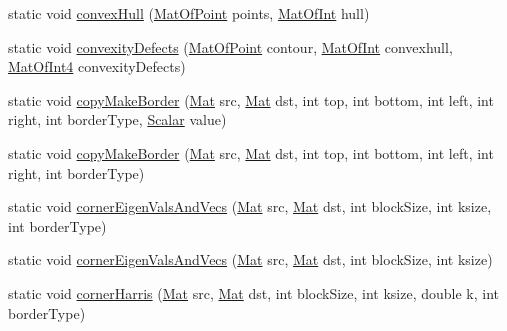 \begin{DoxyCompactItemize}
\item 
static void \mbox{\hyperlink{classorg_1_1opencv_1_1imgproc_1_1_imgproc_aea7e7b3c039ba7d3c04629b3a9cd399d}{convex\+Hull}} (\mbox{\hyperlink{classorg_1_1opencv_1_1core_1_1_mat_of_point}{Mat\+Of\+Point}} points, \mbox{\hyperlink{classorg_1_1opencv_1_1core_1_1_mat_of_int}{Mat\+Of\+Int}} hull)
\item 
static void \mbox{\hyperlink{classorg_1_1opencv_1_1imgproc_1_1_imgproc_a209ed56855c2b90701908839e25f773a}{convexity\+Defects}} (\mbox{\hyperlink{classorg_1_1opencv_1_1core_1_1_mat_of_point}{Mat\+Of\+Point}} contour, \mbox{\hyperlink{classorg_1_1opencv_1_1core_1_1_mat_of_int}{Mat\+Of\+Int}} convexhull, \mbox{\hyperlink{classorg_1_1opencv_1_1core_1_1_mat_of_int4}{Mat\+Of\+Int4}} convexity\+Defects)
\item 
static void \mbox{\hyperlink{classorg_1_1opencv_1_1imgproc_1_1_imgproc_aeeb280b7ea42158d887ce0d82e6ea0e4}{copy\+Make\+Border}} (\mbox{\hyperlink{classorg_1_1opencv_1_1core_1_1_mat}{Mat}} src, \mbox{\hyperlink{classorg_1_1opencv_1_1core_1_1_mat}{Mat}} dst, int top, int bottom, int left, int right, int border\+Type, \mbox{\hyperlink{classorg_1_1opencv_1_1core_1_1_scalar}{Scalar}} value)
\item 
static void \mbox{\hyperlink{classorg_1_1opencv_1_1imgproc_1_1_imgproc_a9a788b12632bb2021d6fc4194c524364}{copy\+Make\+Border}} (\mbox{\hyperlink{classorg_1_1opencv_1_1core_1_1_mat}{Mat}} src, \mbox{\hyperlink{classorg_1_1opencv_1_1core_1_1_mat}{Mat}} dst, int top, int bottom, int left, int right, int border\+Type)
\item 
static void \mbox{\hyperlink{classorg_1_1opencv_1_1imgproc_1_1_imgproc_aa13f522ce6ccde35a54983d35640c3e1}{corner\+Eigen\+Vals\+And\+Vecs}} (\mbox{\hyperlink{classorg_1_1opencv_1_1core_1_1_mat}{Mat}} src, \mbox{\hyperlink{classorg_1_1opencv_1_1core_1_1_mat}{Mat}} dst, int block\+Size, int ksize, int border\+Type)
\item 
static void \mbox{\hyperlink{classorg_1_1opencv_1_1imgproc_1_1_imgproc_a2d6d62e47c79f1dea4f66b9bebbe7b35}{corner\+Eigen\+Vals\+And\+Vecs}} (\mbox{\hyperlink{classorg_1_1opencv_1_1core_1_1_mat}{Mat}} src, \mbox{\hyperlink{classorg_1_1opencv_1_1core_1_1_mat}{Mat}} dst, int block\+Size, int ksize)
\item 
static void \mbox{\hyperlink{classorg_1_1opencv_1_1imgproc_1_1_imgproc_aff9b8e4b52de80802161886bd074cdca}{corner\+Harris}} (\mbox{\hyperlink{classorg_1_1opencv_1_1core_1_1_mat}{Mat}} src, \mbox{\hyperlink{classorg_1_1opencv_1_1core_1_1_mat}{Mat}} dst, int block\+Size, int ksize, double k, int border\+Type)

\end{DoxyCompactItemize}
